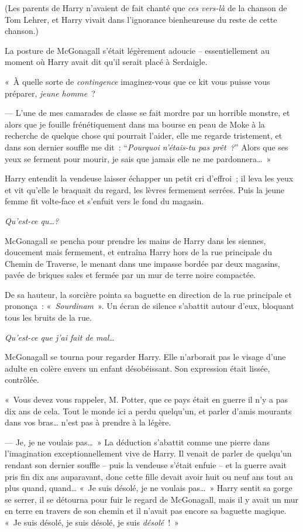 (Les parents de Harry n'avaient de fait chanté que \emph{ces vers-là} de la chanson de Tom Lehrer, et Harry vivait dans l'ignorance bienheureuse du reste de cette chanson.)

La posture de McGonagall s'était légèrement adoucie -- essentiellement au moment où Harry avait dit qu'il serait placé à Serdaigle.

«~À quelle sorte de \emph{contingence} imaginez-vous que ce kit vous puisse vous préparer, \emph{jeune homme}~?

--- L'une de mes camarades de classe se fait mordre par un horrible monstre, et alors que je fouille frénétiquement dans ma bourse en peau de Moke à la recherche de quelque chose qui pourrait l'aider, elle me regarde tristement, et dans son dernier souffle me dit~: “\emph{Pourquoi n'étais-tu pas prêt~?}” Alors que ses yeux se ferment pour mourir, je sais que jamais elle ne me pardonnera…~»


Harry entendit la vendeuse laisser échapper un petit cri d'effroi~; il leva les yeux et vit qu'elle le braquait du regard, les lèvres fermement serrées.
Puis la jeune femme fit volte-face et s'enfuit vers le fond du magasin.

\emph{Qu'est-ce qu…?}

McGonagall se pencha pour prendre les mains de Harry dans les siennes, doucement mais fermement, et entraîna Harry hors de la rue principale du Chemin de Traverse, le menant dans une impasse bordée par deux magasins, pavée de briques sales et fermée par un mur de terre noire compactée.

De sa hauteur, la sorcière pointa sa baguette en direction de la rue principale et prononça~: «~\emph{Sourdinam}~». Un écran de silence s'abattit autour d'eux, bloquant tous les bruits de la rue.

\emph{Qu'est-ce que j'ai fait de mal…}

McGonagall se tourna pour regarder Harry.
Elle n'arborait pas le visage d'une adulte en colère envers un enfant désobéissant.
Son expression était lissée, contrôlée.

«~Vous devez vous rappeler, M. Potter, que ce pays était en guerre il n'y a pas dix ans de cela. Tout le monde ici a perdu quelqu'un, et parler d'amis mourants dans vos bras… n'est pas à prendre à la légère.

--- Je, je ne voulais pas…~»
La déduction s'abattit comme une pierre dans l'imagination exceptionnellement vive de Harry.
Il venait de parler de quelqu'un rendant son dernier souffle -- puis la vendeuse s'était enfuie -- et la guerre avait pris fin dix ans auparavant, donc cette fille devait avoir huit ou neuf ans tout au plus quand, quand…
«~Je suis désolé, je ne voulais pas…~»
Harry sentit sa gorge se serrer, il se détourna pour fuir le regard de McGonagall, mais il y avait un mur en terre en travers de son chemin et il n'avait pas encore sa baguette magique. «~Je suis désolé, je suis désolé, je suis \emph{désolé}~!~»

